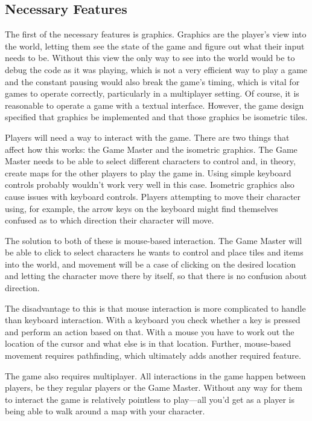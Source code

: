 \subsection{Necessary Features}
The first of the necessary features is graphics. Graphics are the player's view into the world, letting them see the state of the game and figure out what their input needs to be. Without this view the only way to see into the world would be to debug the code as it was playing, which is not a very efficient way to play a game and the constant pausing would also break the game's timing, which is vital for games to operate correctly, particularly in a multiplayer setting. Of course, it is reasonable to operate a game with a textual interface. However, the game design specified that graphics be implemented and that those graphics be isometric tiles.

Players will need a way to interact with the game. There are two things that affect how this works: the Game Master and the isometric graphics. The Game Master needs to be able to select different characters to control and, in theory, create maps for the other players to play the game in. Using simple keyboard controls probably wouldn't work very well in this case. Isometric graphics also cause issues with keyboard controls. Players attempting to move their character using, for example, the arrow keys on the keyboard might find themselves confused as to which direction their character will move.

The solution to both of these is mouse-based interaction. The Game Master will be able to click to select characters he wants to control and place tiles and items into the world, and movement will be a case of clicking on the desired location and letting the character move there by itself, so that there is no confusion about direction.

The disadvantage to this is that mouse interaction is more complicated to handle than keyboard interaction. With a keyboard you check whether a key is pressed and perform an action based on that. With a mouse you have to work out the location of the cursor and what else is in that location. Further, mouse-based movement requires pathfinding, which ultimately adds another required feature.

The game also requires multiplayer. All interactions in the game happen between players, be they regular players or the Game Master. Without any way for them to interact the game is relatively pointless to play---all you'd get as a player is being able to walk around a map with your character.

